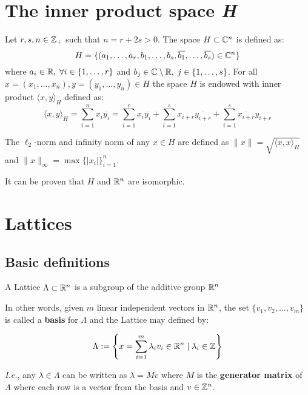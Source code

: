 \documentclass[Ingles]{ic-tese-v3}
\begin{document}
\section{The inner product space \emph{H}}
\label{sec:org8802409}
\begin{definition}
  \label{def:h-space}
  Let $r,s,n \in \mathbb{Z}_+$ such that $n = r + 2s > 0$. The space $H \subset \mathbb{C}^n$ is defined
  as:
  \begin{equation*}
    H = \{(a_1,\dots, a_r, b_1,\dots, b_s, \overline{b_1}, \dots, \overline{b_s}) \in \mathbb{C}^n\}
  \end{equation*}
  where $a_i \in \mathbb{R}, \; \forall i \in \{1,\dots,r\}$ and $b_j \in \mathbb{C} \setminus \mathbb{R}, \; j \in \{1,\dots,
  s\}$. For all $x = \left(x_1, \dots, x_n\right), y = \left(y_1, \dots, y_n\right) \in H$ the space
  $H$ is endowed with inner product $\langle {x,y} \rangle_H$ defined as:
  \begin{equation*}
    \langle {x,y} \rangle_H = \sum_{i=1}^n{x_i \overline{y_i}} = \sum_{i=1}^r{x_i \overline{y_i}} + \sum_{i=1}^s{x_{i+r} \overline{y_{i+r}}} + \sum_{i=1}^s{\overline{x_{i+r}} y_{i+r}}
  \end{equation*}

  The $\ell_2$-norm and infinity norm of any $x \in H$ are defined as $\|x\| =
  \sqrt{\langle{x,x}\rangle_H}$ and $\|x\|_\infty = \max{\{ |x_i| \}}_{i=1}^n $.
\end{definition}

It can be proven that \(H\) and \(\mathbb{R}^n\) are isomorphic.
\section{Lattices}
\label{sec:org946f04d}
\subsection{Basic definitions}
\label{sec:org6875914}

   \begin{definition}
  A Lattice $\Lambda \subset \mathbb{R}^n$ is a subgroup of the additive group $\mathbb{R}^n$
\end{definition}

In other words, given \(m\) linear independent vectors in \(\mathbb{R}^n\), the set
\(\{v_1, v_2, ..., v_m\}\) is called a \textbf{basis} for \(\Lambda\) and the Lattice may defined
by:

\begin{definition}
  \begin{equation*}
    \Lambda := \left\{x = \sum_{i=1}^m{\lambda_iv_i} \in \mathbb{R}^n \; | \; \lambda_i \in \mathbb{Z}\right\}
  \end{equation*}

\emph{I.e.}, any $\lambda \in \Lambda$ can be written as $\lambda = Mv$ where $M$ is the
\textbf{generator matrix} of $\Lambda$ where each row is a vector from the basis and
$v \in \mathbb{Z}^n$.
\end{definition}
\end{document}
